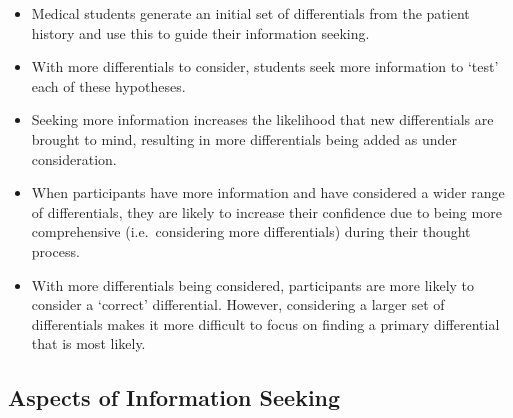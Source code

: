 \documentclass[a4paper, nobind]{templates/ociamthesis}
\providecommand{\tightlist}{%
  \setlength{\itemsep}{0pt}\setlength{\parskip}{0pt}}
\begin{document}
\begin{itemize}
\tightlist
\item
  Medical students generate an initial set of differentials from the patient history and use this to guide their information seeking.
\item
  With more differentials to consider, students seek more information to `test' each of these hypotheses.
\item
  Seeking more information increases the likelihood that new differentials are brought to mind, resulting in more differentials being added as under consideration.
\item
  When participants have more information and have considered a wider range of differentials, they are likely to increase their confidence due to being more comprehensive (i.e.~considering more differentials) during their thought process.
\item
  With more differentials being considered, participants are more likely to consider a `correct' differential. However, considering a larger set of differentials makes it more difficult to focus on finding a primary differential that is most likely.
\end{itemize}

\subsection{Aspects of Information Seeking}\label{aspects-of-information-seeking}
\end{document}
